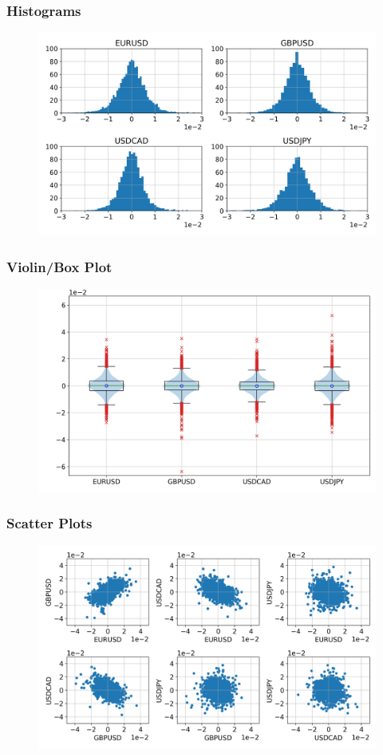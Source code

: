 \documentclass{beamer}
\begin{document}
\begin{frame}
    \frametitle{Histograms}
    \begin{figure}
        \includegraphics[width=1\linewidth]{data_analysis/histograms.png}
    \end{figure}
\end{frame}

\begin{frame}
    \frametitle{Violin/Box Plot}
    \begin{figure}
        \includegraphics[width=1\linewidth]{data_analysis/violin.png}
    \end{figure}
\end{frame}

\begin{frame}
    \frametitle{Scatter Plots}
    \begin{figure}
        \includegraphics[width=1\linewidth]{data_analysis/scatters.png}
    \end{figure}
\end{frame}
\end{document}
